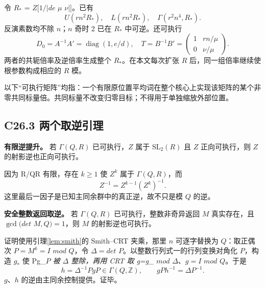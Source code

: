 \documentclass[11pt,a4paper]{article}
\theoremstyle{definition}
\numberwithin{equation}{section}
\begin{document}
{令} {\ensuremath{R_*}} {=} {\ensuremath{Z}{[}\ensuremath{1/|de}} {\ensuremath{\mu }} {\ensuremath{\nu |}{]}。已有} \[
U(rn^2R_*),\quad L(rn^2R_*),\quad
\Gamma(r^2n^4,R_*).
\tag{C26.2.1}
\] {反演素数均不除} {\ensuremath{n}；\ensuremath{n}} {奇时} {2} {已在} {\ensuremath{R_*}} {中可逆。还可执行} \[
D_0=A^{-1}A'=\operatorname{diag}(1,e/d),\quad
T=B^{-1}B'=
\begin{pmatrix}1&rn/\mu\\0&\nu/\mu\end{pmatrix}.
\] {两者的共轭倍率及逆倍率生成整个} {\ensuremath{R_*}。在本文每次扩张} {\ensuremath{R}} {后，同一组倍率继续使根参数构成相应的} {\ensuremath{R}} {模。}

{以下``可执行矩阵''均指：一个有限原位置平均词在整个核心上实现该矩阵的某个非零共同标量倍。共同标量不改变归零目标；不得用于单独缩放外部位置。}

\subsection*{\texorpdfstring{{C26.3} {两个取逆引理}}{C26.3 两个取逆引理}}\label{C26-h159}

\textbf{{有限逆提升。}} {若} {\ensuremath{\Gamma (Q,R)}} {已可执行，\ensuremath{Z}} {属于} {\ensuremath{\mathrm{SL}_{2}(R)}} {且} {\ensuremath{Z}} {正向可执行，则} {\ensuremath{Z}} {的射影逆也正向可执行。}

{因为} {R/QR} {有限，存在} {\ensuremath{k\ge 1}} {使} {\ensuremath{Z^{k}}} {属于} {\ensuremath{\Gamma (Q,R)}，而} \[
Z^{-1}=Z^{k-1}(Z^k)^{-1}.
\tag{C26.3.1}
\] {这里最后一因子是已知主同余群中的真正逆，故不只是模} {\ensuremath{Q}} {的逆。}

\textbf{{安全整数返回取逆。}} {若} {\ensuremath{\Gamma (Q,R)}} {已可执行，整数非奇异返回} {\ensuremath{M}} {真实存在，且} {\ensuremath{\operatorname{gcd}(det}} {\ensuremath{M,Q)=1}，则} {\ensuremath{M}} {的射影逆也可执行。}

{证明使用}引理\ref{lem:smith}{的} {Smith--CRT} {夹乘，那里} {\ensuremath{n}} {可逐字替换为} {\ensuremath{Q}：取正偶次} {\ensuremath{P=M^{k}=I}} {\ensuremath{mod}} {\ensuremath{Q}，令} {\ensuremath{\Delta =det}} {\ensuremath{P}。以整数行列式一的行列变换对角化} {\ensuremath{P}，构造} {\ensuremath{g_*}} {使} {Pg\_}\emph{{\ensuremath{P}} {被} {\ensuremath{\Delta }} {整除，再用} {CRT} {取} {g=g\_}} {\ensuremath{mod}} {\ensuremath{\Delta }、\ensuremath{g=I}} {\ensuremath{mod}} {\ensuremath{Q}。于是} \[
h=\Delta^{-1}PgP\in\Gamma(Q,\mathbb Z),\qquad
gPh^{-1}=\Delta P^{-1}.
\] {\ensuremath{g}、\ensuremath{h}} {的逆由主同余控制提供。证毕。}
\end{document}
